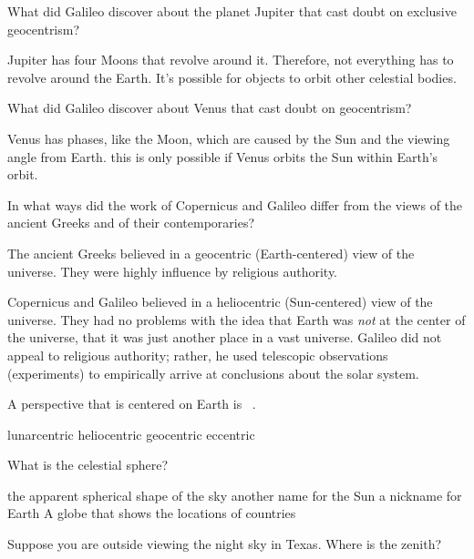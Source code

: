 \documentclass[addpoints]{exam}
\begin{document}
\begin{questions}
\question %
What did Galileo discover about the planet Jupiter that cast doubt on exclusive geocentrism?

\begin{solution}
    Jupiter has four Moons that revolve around it. Therefore, not everything has to revolve around the Earth. It's possible for objects to orbit other celestial bodies.
\end{solution}

\question %
What did Galileo discover about Venus that cast doubt on geocentrism?

\begin{solution}
    Venus has phases, like the Moon, which are caused by the Sun and the viewing angle from Earth. this is only possible if Venus orbits the Sun within Earth's orbit.
\end{solution}

\question %
In what ways did the work of Copernicus and Galileo differ from the views of the ancient Greeks and of their contemporaries?

\begin{solution}
    The ancient Greeks believed in a geocentric (Earth-centered) view of the universe. They were highly influence by religious authority.

    Copernicus and Galileo believed in a heliocentric (Sun-centered) view of the universe. They had no problems with the idea that Earth was \textit{not} at the center of the universe, that it was just another place in a vast universe. Galileo did not appeal to religious authority; rather, he used telescopic observations (experiments) to empirically arrive at conclusions about the solar system.
\end{solution}

\question
A perspective that is centered on Earth is \fillin\ .

\begin{choices}
\choice lunarcentric
\choice heliocentric
\correctchoice geocentric
\choice eccentric
\end{choices}


\question
What is the celestial sphere?

\begin{choices}
\correctchoice the apparent spherical shape of the sky
\choice another name for the Sun
\choice a nickname for Earth
\choice A globe that shows the locations of countries
\end{choices}

\question
Suppose you are outside viewing the night sky in Texas. Where is the zenith?


\end{questions}
\end{document}
